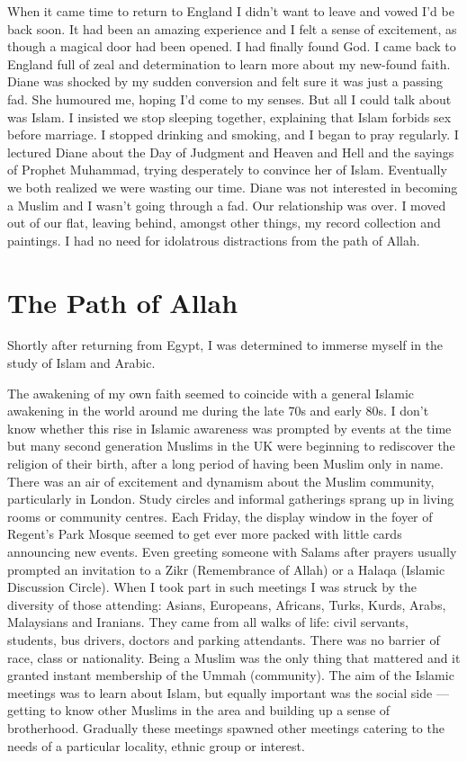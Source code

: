 \documentclass[12pt]{memoir}
\newcommand{\cor}[2]{#2} %
\begin{document}
When it came time to return to England I didn’t want to leave
and vowed I’d be back soon.
It had been an amazing experience and I felt a sense of excitement,
as though a magical door had been opened.
I had finally found God.
I came back to England full of zeal and determination
to learn more about my new-found faith.
Diane was shocked by my sudden conversion
and felt sure it was just a passing fad.
She humoured me, hoping I’d come to my senses.
But all I could talk about was Islam.
I insisted we stop sleeping together,
explaining that Islam forbids sex before marriage.
I stopped drinking and smoking, and I began to pray regularly.
I lectured Diane about the Day of Judgment and Heaven and Hell
and the sayings of Prophet Muhammad,
trying desperately to convince her of Islam.
Eventually we both realized we were wasting our time.
Diane was not interested in becoming a Muslim
and I wasn’t going through a fad.
Our relationship was over.
I moved out of our flat, leaving behind, amongst other things,
my record collection and paintings.
I had no need for idolatrous distractions from the path of Allah.


\chapter{The Path of Allah}


Shortly after returning from Egypt,
I was determined to immerse myself in the study of Islam and Arabic.

The awakening of my own faith seemed to coincide
with a general Islamic awakening in the world around me
during the late 70s and early 80s.
I don’t know whether this rise in Islamic awareness was prompted by events
at the time but many second generation Muslims in the UK
were beginning to \cor{re-discover}{rediscover} the religion of their birth,
after a long period of having been Muslim only in name.
There was an air of excitement and dynamism about the Muslim community,
particularly in London.
Study circles and informal gatherings sprang up
in living rooms or community centres.
Each Friday, the display window in the foyer of Regent’s Park Mosque
seemed to get ever more packed with little cards announcing new events.
Even greeting someone with Salams after prayers usually prompted an invitation
to a Zikr (Remembrance of Allah) or a Halaqa (Islamic Discussion Circle).
When I took part in such meetings
I was struck by the diversity of those attending:
Asians, Europeans, Africans, Turks, Kurds, Arabs, Malaysians and Iranians.
They came from all walks of life: civil servants, students, bus drivers,
doctors and parking attendants.
There was no barrier of race, class or nationality.
Being a Muslim was the only thing that mattered
and it granted instant membership of the Ummah (community).
The aim of the Islamic meetings was to learn about Islam,
but equally important was the social side —
getting to know other Muslims in the area
and building up a sense of brotherhood.
Gradually these meetings spawned other meetings
catering to the needs of a particular locality, ethnic group or interest.
\end{document}
